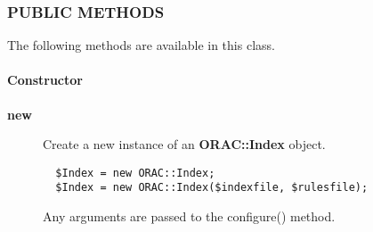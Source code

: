\subsubsection*{PUBLIC METHODS\label{ORAC::Index_PUBLIC_METHODS}}


The following methods are available in this class.

\paragraph*{Constructor\label{ORAC::Index_Constructor}}
\begin{description}

\item[\textbf{new}] \mbox{}

Create a new instance of an \textbf{ORAC::Index} object.

\begin{verbatim}
  $Index = new ORAC::Index;
  $Index = new ORAC::Index($indexfile, $rulesfile);
\end{verbatim}


Any arguments are passed to the configure() method.

\end{description}
